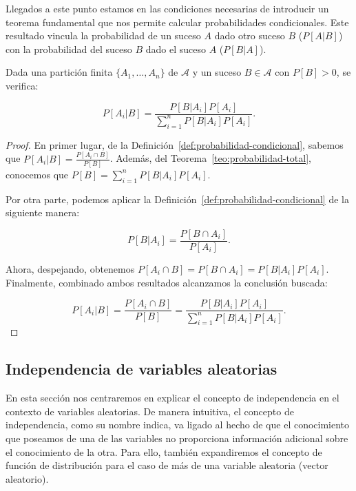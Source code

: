 Llegados a este punto estamos en las condiciones necesarias de introducir un teorema fundamental que nos permite calcular probabilidades condicionales. Este resultado vincula la probabilidad de un suceso $A$ dado otro suceso $B$ ($P[A|B]$) con la probabilidad del suceso $B$ dado el suceso $A$ ($P[B|A]$).

\begin{teorema}\label{teo:teorema-de-bayes}
    Dada una partición finita $\{A_1, \ldots, A_n \}$ de $\mathcal{A}$ y un suceso $B \in \mathcal{A}$ con $P[B] > 0$, se verifica:

    \[ P[A_i | B] = \frac{P[B | A_i]P[A_i]}{\sum_{i=1}^n P[B|A_i]P[A_i]}. \]
\end{teorema}

\begin{proof}
    En primer lugar, de la Definición~\ref{def:probabilidad-condicional}, sabemos que
     $P[A_i|B] = \frac{P[A_i \cap B]}{P[B]}$. Además, del Teorema~\ref{teo:probabilidad-total}, conocemos que $P[B] = \sum_{i=1}^n P[B|A_i]P[A_i]$.

    Por otra parte, podemos aplicar la Definición~\ref{def:probabilidad-condicional} de la siguiente manera:

    \[ P[B|A_i] = \frac{P[B \cap A_i]}{P[A_i]}. \]

    Ahora, despejando, obtenemos $P[A_i \cap B] = P[B \cap A_i] = P[B|A_i]{P[A_i]}$. Finalmente, combinado ambos resultados alcanzamos la conclusión buscada:

    \[ P[A_i|B] = \frac{P[A_i \cap B]}{P[B]} = \frac{P[B | A_i]P[A_i]}{\sum_{i=1}^n P[B|A_i]P[A_i]}. \]
    
\end{proof}

\subsection{Independencia de variables aleatorias}

En esta sección nos centraremos en explicar el concepto de independencia en el contexto de variables aleatorias. De manera intuitiva, el concepto de independencia, como su nombre indica, va ligado al hecho de que el conocimiento que poseamos de una de las variables no proporciona información adicional sobre el conocimiento de la otra. Para ello, también expandiremos el concepto de función de distribución para el caso de más de una variable aleatoria (vector aleatorio).

